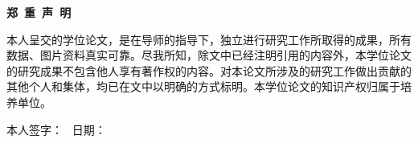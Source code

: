 \vbox{}
\vskip 1cm
\centerline{\songti{}\textbf{郑\ 重\ 声\ 明}}
\vskip 2cm

\songti{}
本人呈交的学位论文，是在导师的指导下，独立进行研究工作所取得的成果，所有数据、图片资料真实可靠。尽我所知，除文中已经注明引用的内容外，本学位论文的研究成果不包含他人享有著作权的内容。对本论文所涉及的研究工作做出贡献的其他个人和集体，均已在文中以明确的方式标明。本学位论文的知识产权归属于培养单位。

\vskip 3cm

本人签字： \qquad \quad \ 日期：



